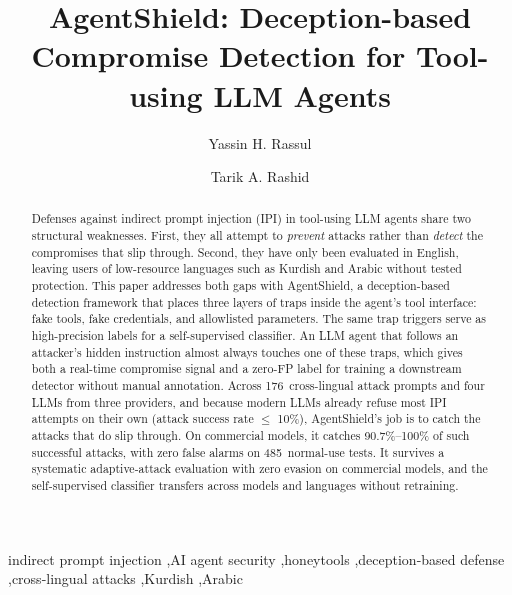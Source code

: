 \documentclass[preprint,12pt]{elsarticle}
\begin{document}
\begin{frontmatter}

\title{AgentShield: Deception-based Compromise Detection for Tool-using LLM Agents}

\author[cse]{Yassin H. Rassul}

\author[cse,aiic]{Tarik A. Rashid}


\address[cse]{Computer Science and Engineering Department, School of Science and Engineering, University of Kurdistan Hewl\^{e}r, Erbil, Iraq}
\address[aiic]{Artificial Intelligence and Innovation Centre, University of Kurdistan Hewl\^{e}r, Erbil, Iraq}

\begin{abstract}
Defenses against indirect prompt injection (IPI) in tool-using LLM agents share two structural weaknesses. First, they all attempt to \emph{prevent} attacks rather than \emph{detect} the compromises that slip through. Second, they have only been evaluated in English, leaving users of low-resource languages such as Kurdish and Arabic without tested protection. This paper addresses both gaps with AgentShield, a deception-based detection framework that places three layers of traps inside the agent's tool interface: fake tools, fake credentials, and allowlisted parameters. The same trap triggers serve as high-precision labels for a self-supervised classifier. An LLM agent that follows an attacker's hidden instruction almost always touches one of these traps, which gives both a real-time compromise signal and a zero-FP label for training a downstream detector without manual annotation. Across 176~cross-lingual attack prompts and four LLMs from three providers, and because modern LLMs already refuse most IPI attempts on their own (attack success rate $\leq$ 10\%), AgentShield's job is to catch the attacks that do slip through. On commercial models, it catches 90.7\%--100\% of such successful attacks, with zero false alarms on 485~normal-use tests. It survives a systematic adaptive-attack evaluation with zero evasion on commercial models, and the self-supervised classifier transfers across models and languages without retraining.
\end{abstract}

\begin{keyword}
indirect prompt injection \sep AI agent security \sep honeytools \sep deception-based defense \sep cross-lingual attacks \sep Kurdish \sep Arabic
\end{keyword}

\end{frontmatter}
\end{document}
